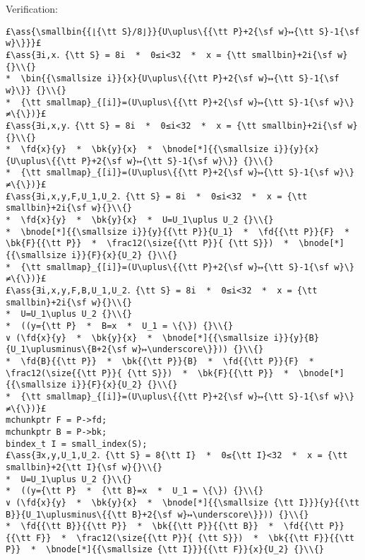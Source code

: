 \documentclass[10pt,a4paper,twoside]{report}
\makeatletter
\newcommand{\ml}[2][t]{\mbox{\mdseries\begin{tabular}[#1]{@{}L@{}}#2\end{tabular}}}
\newcommand{\ass}[1]{\ensuremath{{\color{blue}\left\{\ml[c]{#1}\right\}}}}
\makeatother
\begin{document}
\noindent Verification:
\begin{lstlisting}
£\ass{\smallbin{{⌊{\tt S}/8⌋}}{U\uplus\{{\tt P}+2{\sf w}↦{\tt S}-1{\sf w}\}}}£
£\ass{∃i,x．{\tt S} = 8i  *  0≤i<32  *  x = {\tt smallbin}+2i{\sf w}{}\\{}
*  \bin{{\smallsize i}}{x}{U\uplus\{{\tt P}+2{\sf w}↦{\tt S}-1{\sf w}\}} {}\\{}
*  {\tt smallmap}_{[i]}=(U\uplus\{{\tt P}+2{\sf w}↦{\tt S}-1{\sf w}\}≠\{\})}£
£\ass{∃i,x,y．{\tt S} = 8i  *  0≤i<32  *  x = {\tt smallbin}+2i{\sf w}{}\\{}
*  \fd{x}{y}  *  \bk{y}{x}  *  \bnode[*]{{\smallsize i}}{y}{x}{U\uplus\{{\tt P}+2{\sf w}↦{\tt S}-1{\sf w}\}} {}\\{}
*  {\tt smallmap}_{[i]}=(U\uplus\{{\tt P}+2{\sf w}↦{\tt S}-1{\sf w}\}≠\{\})}£
£\ass{∃i,x,y,F,U_1,U_2．{\tt S} = 8i  *  0≤i<32  *  x = {\tt smallbin}+2i{\sf w}{}\\{}
*  \fd{x}{y}  *  \bk{y}{x}  *  U=U_1\uplus U_2 {}\\{}
*  \bnode[*]{{\smallsize i}}{y}{{\tt P}}{U_1}  *  \fd{{\tt P}}{F}  *  \bk{F}{{\tt P}}  *  \frac12(\size{{\tt P}}{ {\tt S}})  *  \bnode[*]{{\smallsize i}}{F}{x}{U_2} {}\\{}
*  {\tt smallmap}_{[i]}=(U\uplus\{{\tt P}+2{\sf w}↦{\tt S}-1{\sf w}\}≠\{\})}£
£\ass{∃i,x,y,F,B,U_1,U_2．{\tt S} = 8i  *  0≤i<32  *  x = {\tt smallbin}+2i{\sf w}{}\\{}
*  U=U_1\uplus U_2 {}\\{}
*  ((y={\tt P}  *  B=x  *  U_1 = \{\}) {}\\{}
∨ (\fd{x}{y}  *  \bk{y}{x}  *  \bnode[*]{{\smallsize i}}{y}{B}{U_1\uplusminus\{B+2{\sf w}↦\underscore\}})) {}\\{}
*  \fd{B}{{\tt P}}  *  \bk{{\tt P}}{B}  *  \fd{{\tt P}}{F}  *  \frac12(\size{{\tt P}}{ {\tt S}})  *  \bk{F}{{\tt P}}  *  \bnode[*]{{\smallsize i}}{F}{x}{U_2} {}\\{}
*  {\tt smallmap}_{[i]}=(U\uplus\{{\tt P}+2{\sf w}↦{\tt S}-1{\sf w}\}≠\{\})}£
mchunkptr F = P->fd;
mchunkptr B = P->bk;
bindex_t I = small_index(S);
£\ass{∃x,y,U_1,U_2．{\tt S} = 8{\tt I}  *  0≤{\tt I}<32  *  x = {\tt smallbin}+2{\tt I}{\sf w}{}\\{}
*  U=U_1\uplus U_2 {}\\{}
*  ((y={\tt P}  *  {\tt B}=x  *  U_1 = \{\}) {}\\{}
∨ (\fd{x}{y}  *  \bk{y}{x}  *  \bnode[*]{{\smallsize {\tt I}}}{y}{{\tt B}}{U_1\uplusminus\{{\tt B}+2{\sf w}↦\underscore\}})) {}\\{}
*  \fd{{\tt B}}{{\tt P}}  *  \bk{{\tt P}}{{\tt B}}  *  \fd{{\tt P}}{{\tt F}}  *  \frac12(\size{{\tt P}}{ {\tt S}})  *  \bk{{\tt F}}{{\tt P}}  *  \bnode[*]{{\smallsize {\tt I}}}{{\tt F}}{x}{U_2} {}\\{}

\end{lstlisting}
\end{document}
